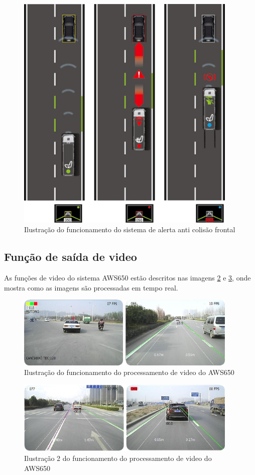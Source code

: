 \begin{figure}[h]
  \centering
  \includegraphics[width=400px, scale=1]{figuras/funcionamento_sistema_frontal}
  \caption{ Ilustração do funcionamento do sistema de alerta anti colisão frontal}
\label{fig:funcionamento_sistema_frontal}
\end{figure}

\subsection{Função de saída de video}
As funções de video do sistema AWS650 estão descritos nas imagens \ref{fig:visao_camera} e \ref{fig:visao_camera2}, onde mostra como as imagens são processadas em tempo real.


\begin{figure}[h]
  \centering
  \includegraphics[width=400px, scale=1]{figuras/visao_camera}
  \caption{Ilustração do funcionamento do processamento de video do AWS650}
\label{fig:visao_camera}
\end{figure}

\begin{figure}[h]
  \centering
  \includegraphics[width=400px, scale=1]{figuras/visao_camera2}
  \caption{Ilustração 2 do funcionamento do processamento de video do AWS650}
\label{fig:visao_camera2}
\end{figure}

